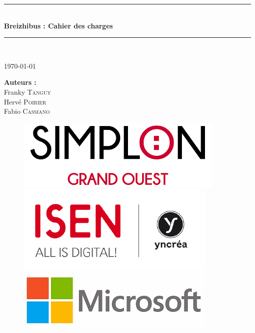 \documentclass[french]{article}
\begin{document}
\begin{titlepage}

\newcommand{\HRule}{\rule{\linewidth}{0.5mm}} %

\center %
 
\HRule \\[0.4cm]
\vspace{1cm}
{ \huge \bfseries Breizhibus : Cahier des charges}\\ %
\vspace{1cm}
\HRule \\[1cm]
 
\vspace{1cm}

\Large \today

\vspace{3cm}

\begin{minipage}{0.4\textwidth}
\begin{center}
\Large \textbf{Auteurs :}\\
\vspace{0.5cm}
Franky \textsc{Tanguy} \\
Hervé \textsc{Poirier}\\
Fabio \textsc{Cassiano}
\end{center}
\end{minipage}

\vspace{5cm}

\begin{figure}[!ht]
	\includegraphics[height=0.1\columnwidth]{Image/logo/logo_simplon.png}
	\hspace*{0.5cm}
	\includegraphics[height=0.12\columnwidth]{Image/logo/logo_Isen.png}
	\hspace*{0.5cm}
	\includegraphics[height=0.1\columnwidth]{Image/logo/logo_microsoft.jpg}
\end{figure}

\vfill

\end{titlepage}
\end{document}
